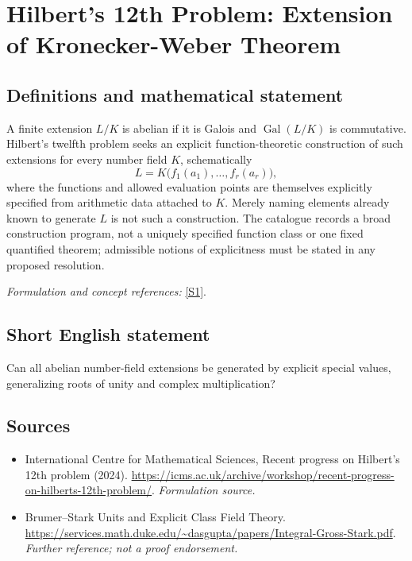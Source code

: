 \documentclass[11pt]{article}
\begin{document}
\section*{\texorpdfstring{Hilbert's 12th Problem: Extension of Kronecker-Weber Theorem}{Hilbert's 12th Problem: Extension of Kronecker-Weber Theorem}}\label{45}
\subsection{Definitions and mathematical statement}
A finite extension $L/K$ is abelian if it is Galois and $\operatorname{Gal}(L/K)$ is commutative. Hilbert's twelfth problem seeks an explicit function-theoretic construction of such extensions for every number field $K$, schematically
\[
 L=K\bigl(f_1(a_1),\ldots,f_r(a_r)\bigr),
\]
where the functions and allowed evaluation points are themselves explicitly specified from arithmetic data attached to $K$. Merely naming elements already known to generate $L$ is not such a construction. The catalogue records a broad construction program, not a uniquely specified function class or one fixed quantified theorem; admissible notions of explicitness must be stated in any proposed resolution.
\par\smallskip\textit{Formulation and concept references:} \href{https://icms.ac.uk/archive/workshop/recent-progress-on-hilberts-12th-problem/}{[S1]}.

\subsection{Short English statement}
Can all abelian number-field extensions be generated by explicit special values, generalizing roots of unity and complex multiplication?
\subsection{Sources}
\begin{itemize}
\item[S1]International Centre for Mathematical Sciences, Recent progress on Hilbert's 12th problem (2024).
\url{https://icms.ac.uk/archive/workshop/recent-progress-on-hilberts-12th-problem/}.
\textit{Formulation source.}
\item[S2]Brumer–Stark Units and Explicit Class Field Theory.
\url{https://services.math.duke.edu/~dasgupta/papers/Integral-Gross-Stark.pdf}.
\textit{Further reference; not a proof endorsement.}
\end{itemize}
\end{document}
